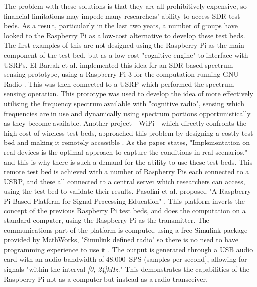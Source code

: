 \documentclass[../main.tex]{subfiles}
\begin{document}
The problem with these solutions is that they are all prohibitively expensive, so financial limitations may impede many researchers' ability to access SDR test beds.
As a result, particularly in the last two years, a number of groups have looked to the Raspberry Pi as a low-cost alternative to develop these test beds.
The first examples of this are not designed using the Raspberry Pi as the main component of the test bed, but as a low cost "cognitive engine" to interface with USRPs.
El Barrak et al. implemented this idea for an SDR-based spectrum sensing prototype, using a Raspberry Pi 3 for the computation running GNU Radio \cite{pap_PiSDRTB_Spectrum}.
This was then connected to a USRP which performed the spectrum sensing operation.
This prototype was used to develop the idea of more effectively utilising the frequency spectrum available with "cognitive radio", sensing which frequencies are in use and dynamically using spectrum portions opportunistically as they become available.
Another project - WiPi - which directly confronts the high cost of wireless test beds, approached this problem by designing a costly test bed and making it remotely accessible \cite{pap_WiPi}.
As the paper states, "Implementation on real devices is the optimal approach to capture the conditions in real scenarios." and this is why there is such a demand for the ability to use these test beds.
This remote test bed is achieved with a number of Raspberry Pis each connected to a USRP, and these all connected to a central server which researchers can access, using the test bed to validate their results.
Pasolini et al. proposed "A Raspberry Pi-Based Platform for Signal Processing Education" \cite{pap_PiSimulinkEducation}.
This platform inverts the concept of the previous Raspberry Pi test beds, and does the computation on a standard computer, using the Raspberry Pi as the transmitter.
The communications part of the platform is computed using a free Simulink package provided by MathWorks, "Simulink defined radio" so there is no need to have programming  experience to use it \cite{web_SimulinkDR}.
The output is generated through a USB audio card with an audio bandwidth of \SI{48,000}{SPS} (samples per second), allowing for signals "within the interval \textit{[0, 24]kHz}."
This demonstrates the capabilities of the Raspberry Pi not as a computer but instead as a radio transceiver.\\

%	
\end{document}
